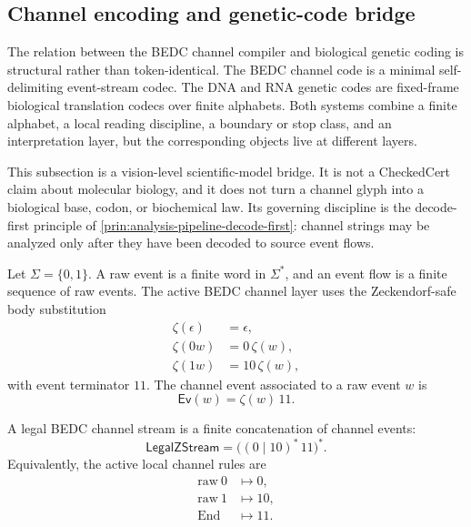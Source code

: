 \subsection{Channel encoding and genetic-code bridge}
\label{subsec:philosophy-channel-genetic-code-bridge}

The relation between the BEDC channel compiler and biological genetic
coding is structural rather than token-identical. The BEDC channel code
is a minimal self-delimiting event-stream codec. The DNA and RNA genetic
codes are fixed-frame biological translation codecs over finite
alphabets. Both systems combine a finite alphabet, a local reading
discipline, a boundary or stop class, and an interpretation layer, but
the corresponding objects live at different layers.

This subsection is a vision-level scientific-model bridge. It is not a
CheckedCert claim about molecular biology, and it does not turn a
channel glyph into a biological base, codon, or biochemical law. Its
governing discipline is the decode-first principle of
\autoref{prin:analysis-pipeline-decode-first}: channel strings may be
analyzed only after they have been decoded to source event flows.

\begin{definition}
\label{def:philosophy-active-channel-event}
Let $\Sigma=\{0,1\}$. A raw event is a finite word in $\Sigma^{*}$, and
an event flow is a finite sequence of raw events. The active BEDC
channel layer uses the Zeckendorf-safe body substitution
$$
\begin{aligned}
  \zeta(\epsilon) &= \epsilon,\\
  \zeta(0w) &= 0\,\zeta(w),\\
  \zeta(1w) &= 10\,\zeta(w),
\end{aligned}
$$
with event terminator $11$. The channel event associated to a raw event
$w$ is
$$
  \mathsf{Ev}(w)=\zeta(w)\,11.
$$
\end{definition}

\begin{definition}
\label{def:philosophy-legal-channel-stream}
A legal BEDC channel stream is a finite concatenation of channel
events:
$$
  \mathsf{LegalZStream}
  =
  \big((0\mid 10)^{*}\,11\big)^{*}.
$$
Equivalently, the active local channel rules are
$$
\begin{aligned}
  \mathrm{raw}\ 0 &\longmapsto 0,\\
  \mathrm{raw}\ 1 &\longmapsto 10,\\
  \mathrm{End} &\longmapsto 11.
\end{aligned}
$$
\end{definition}

